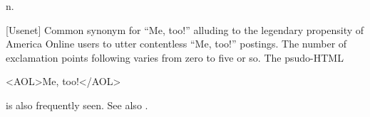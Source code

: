  n.

[Usenet] Common synonym for ``Me, too!'' alluding to the legendary propensity of America Online users to utter contentless ``Me, too!''
postings. The number of exclamation points following varies from zero to five or so. The psudo-HTML

\begin{usenet}
	<AOL>Me, too!</AOL>
\end{usenet}

is also frequently seen. See also .


